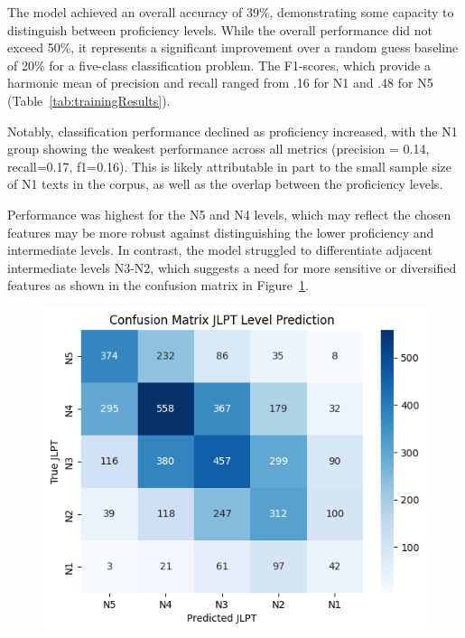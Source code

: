 The model achieved an overall accuracy of 39\%, demonstrating some capacity to distinguish between proficiency
levels.
While the overall performance did not exceed 50\%, it represents a significant improvement over a random guess
baseline of 20\% for a five-class classification problem. The F1-scores, which provide a harmonic mean of precision
and recall ranged from .16 for N1 and .48 for N5 (Table~\ref{tab:trainingResults}).

Notably, classification performance declined as proficiency increased, with the N1 group showing the weakest
performance across all metrics (precision = 0.14, recall=0.17, f1=0.16). This is likely attributable in part to the
small sample size of N1 texts in the corpus, as well as the overlap between the proficiency levels.

Performance was highest for the N5 and N4 levels, which may reflect the chosen features may be more robust against
distinguishing the lower proficiency and intermediate levels. In contrast, the model struggled to differentiate
adjacent intermediate levels N3-N2, which suggests a need for more sensitive or diversified features as shown in the
confusion matrix in Figure~\ref{fig:conMA}.

\begin{figure}[h!]
           \centering
           \includegraphics[scale=.4]{img/confusionMatrix}
           \caption[Confusion Matrix for JLPT Level Prediction]{}
           \label{fig:conMA}
\end{figure}

